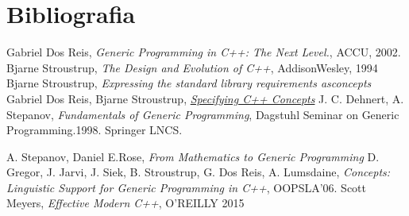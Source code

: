 \documentclass[11pt, a4paper]{article}
\begin{document}
	\section{Bibliografia}
	\begin{thebibliography}{6}
	
	 Gabriel Dos Reis, \emph{Generic Programming in C++: The Next Level.}, ACCU, 2002.
	 Bjarne Stroustrup, \emph{The Design and Evolution of C++}, AddisonWesley, 1994
	  Bjarne Stroustrup, \emph{Expressing the standard library requirements asconcepts}	
	 Gabriel Dos Reis, Bjarne Stroustrup, \href{http://www.stroustrup.com/popl06.pdf}{\emph{Specifying C++ Concepts}}
	 J. C. Dehnert, A. Stepanov, \emph{Fundamentals of Generic Programming}, Dagstuhl Seminar on Generic Programming.1998. Springer LNCS.

	 A. Stepanov, Daniel E.Rose, \emph{From Mathematics to Generic Programming}
	 D. Gregor, J. Jarvi, J. Siek, B. Stroustrup, G. Dos Reis, A. Lumsdaine, \emph{Concepts: Linguistic Support for Generic Programming in C++}, OOPSLA’06.
	 Scott Meyers, \emph{Effective Modern C++}, O'REILLY 2015
	\end{thebibliography}
\end{document}
